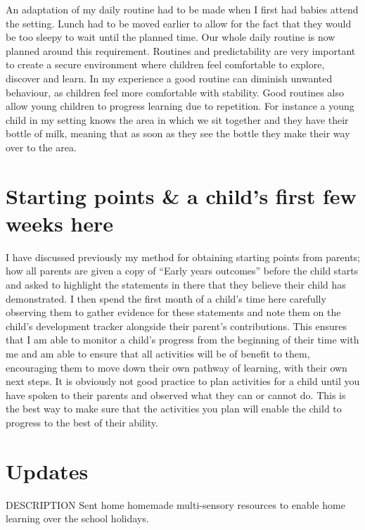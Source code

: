 \documentclass[10pt,a4paper]{report}
\makeatletter
\newcommand{\DESCRIPTION@original@item}{}
\let\DESCRIPTION@original@item\item
\newcommand*{\DESCRIPTION@envir}{DESCRIPTION}
\newlength{\DESCRIPTION@totalleftmargin}
\newlength{\DESCRIPTION@linewidth}
\newcommand{\DESCRIPTION@makelabel}[1]{\llap{#1}}%
\newcommand{\DESCRIPTION@item}[1][]{%
  \setlength{\@totalleftmargin}%
       {\DESCRIPTION@totalleftmargin+\widthof{\textbf{#1 }}-\leftmargin}%
  \setlength{\linewidth}
       {\DESCRIPTION@linewidth-\widthof{\textbf{#1 }}+\leftmargin}%
  \par\parshape \@ne \@totalleftmargin \linewidth
  \DESCRIPTION@original@item[\textbf{#1}]%
}
\newenvironment{DESCRIPTION}
  {\list{}{\setlength{\labelwidth}{0cm}%
           \let\makelabel\DESCRIPTION@makelabel}%
   \setlength{\DESCRIPTION@totalleftmargin}{\@totalleftmargin}%
   \setlength{\DESCRIPTION@linewidth}{\linewidth}%
   \renewcommand{\item}{\ifx\@currenvir\DESCRIPTION@envir
                           \expandafter\DESCRIPTION@item
                        \else
                           \expandafter\DESCRIPTION@original@item
                        \fi}}
  {\endlist}
\makeatother
\begin{document}
An adaptation of my daily routine had to be made when I first had babies attend the setting. Lunch had to be moved earlier to allow for the fact that they would be too sleepy to wait until the planned time. Our whole daily routine is now planned around this requirement. Routines and predictability are very important to create a secure environment where children feel comfortable to explore, discover and learn. In my experience a good routine can diminish unwanted  behaviour, as children feel more comfortable with stability. Good routines also allow young children to progress learning due to repetition. For instance a young child in my setting knows the area in which we sit together and they have their bottle of milk, meaning that as soon as they see the bottle they make their way over to the area. 

\section{Starting points \& a child's first few weeks here}

I have discussed previously my method for obtaining starting points from parents; how all parents are given a copy of “Early years outcomes” before the child starts and asked to highlight the statements in there that they believe their child has demonstrated. I then spend the first month of a child's time here carefully observing them to gather evidence for these statements and note them on the child's development tracker alongside their parent's contributions. This ensures that I am able to monitor a child's progress from the beginning of their time with me and am able to ensure that all activities will be of benefit to them, encouraging them to move down their own pathway of learning, with their own next steps. It is obviously not good practice to plan activities for a child until you have spoken to their parents and observed what they can or cannot do. This is the best way to make sure that the activities you plan will enable the child to progress to the best of their ability.

\section{Updates}

\begin{DESCRIPTION}
\item [December 2016] Sent home homemade multi-sensory resources to enable home learning over the school holidays.
\end{DESCRIPTION}
\end{document}
